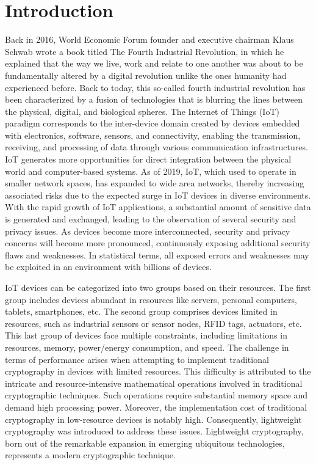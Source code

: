 \documentclass[conference,compsoc]{IEEEtran}
\begin{document}
\section{Introduction}
Back in 2016, World Economic Forum founder and executive chairman Klaus Schwab wrote a book titled The Fourth Industrial Revolution, in which he explained that the way we live, work and relate to one another was about to be fundamentally altered by a digital revolution unlike the ones humanity had experienced before. Back to today, this so-called fourth industrial revolution has been characterized by a fusion of technologies that is blurring the lines between the physical, digital, and biological spheres\cite{WorldEconomicForum}.
The Internet of Things (IoT) paradigm corresponds to the inter-device domain created by devices embedded with electronics, software, sensors, and connectivity, enabling the transmission, receiving, and processing of data through various communication infrastructures. IoT generates more opportunities for direct integration between the physical world and computer-based systems.
As of 2019, IoT, which used to operate in smaller network spaces, has expanded to wide area networks, thereby increasing associated risks due to the expected surge in IoT devices in diverse environments. With the rapid growth of IoT applications, a substantial amount of sensitive data is generated and exchanged, leading to the observation of several security and privacy issues. As devices become more interconnected, security and privacy concerns will become more pronounced, continuously exposing additional security flaws and weaknesses. In statistical terms, all exposed errors and weaknesses may be exploited in an environment with billions of devices.

IoT devices can be categorized into two groups based on their resources. The first group includes devices abundant in resources like servers, personal computers, tablets, smartphones, etc. The second group comprises devices limited in resources, such as industrial sensors or sensor nodes, RFID tags, actuators, etc.
This last group of devices face multiple constraints, including limitations in resources, memory, power/energy consumption, and speed. The challenge in terms of performance arises when attempting to implement traditional cryptography in devices with limited resources. This difficulty is attributed to the intricate and resource-intensive mathematical operations involved in traditional cryptographic techniques. Such operations require substantial memory space and demand high processing power. Moreover, the implementation cost of traditional cryptography in low-resource devices is notably high. Consequently, lightweight cryptography was introduced to address these issues. Lightweight cryptography, born out of the remarkable expansion in emerging ubiquitous technologies, represents a modern cryptographic technique.
\end{document}
